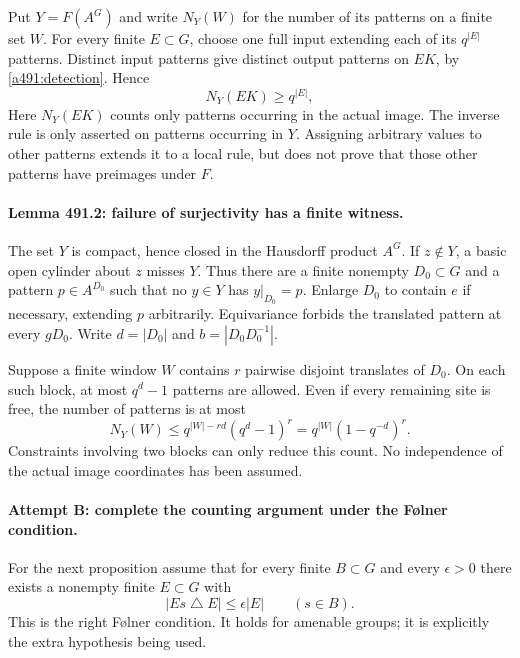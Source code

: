 \documentclass[11pt]{article}
\begin{document}
Put $Y=F(A^G)$ and write $N_Y(W)$ for the number of its patterns on a finite set $W$.
For every finite $E\subset G$, choose one full input extending each of its
$q^{|E|}$ patterns. Distinct input patterns give distinct output patterns
on $EK$, by \eqref{a491:detection}. Hence
\begin{equation}\label{a491:lower}
                         N_Y(EK)\ge q^{|E|},
\end{equation}
Here $N_Y(EK)$ counts only patterns occurring in the actual image.
The inverse rule is only asserted on patterns occurring in $Y$.
Assigning arbitrary values to other patterns extends it to a local rule,
but does not prove that those other patterns have preimages under $F$.

\paragraph{Lemma 491.2: failure of surjectivity has a finite witness.}
The set $Y$ is compact, hence closed in the Hausdorff product $A^G$.
If $z\notin Y$, a basic open cylinder about $z$ misses $Y$. Thus there
are a finite nonempty $D_0\subset G$ and a pattern $p\in A^{D_0}$ such
that no $y\in Y$ has $y|_{D_0}=p$. Enlarge $D_0$ to contain $e$ if
necessary, extending $p$ arbitrarily. Equivariance forbids the translated
pattern at every $gD_0$. Write $d=|D_0|$ and $b=|D_0D_0^{-1}|$.

Suppose a finite window $W$ contains $r$ pairwise disjoint translates
of $D_0$. On each such block, at most $q^d-1$ patterns are allowed.
Even if every remaining site is free, the number of patterns is at most
\begin{equation}\label{a491:upper}
 N_Y(W)\le q^{|W|-rd}(q^d-1)^r
          =q^{|W|}(1-q^{-d})^r.
\end{equation}
Constraints involving two blocks can only reduce this count. No independence
of the actual image coordinates has been assumed.

\paragraph{Attempt B: complete the counting argument under the F\o lner condition.}
For the next proposition assume that for every finite $B\subset G$ and
every $\epsilon>0$ there exists a nonempty finite $E\subset G$ with
\[
             |Es\mathbin{\triangle}E|\le\epsilon|E|
                         \qquad(s\in B).
\]
This is the right F\o lner condition. It holds for amenable groups; it
is explicitly the extra hypothesis being used.
\end{document}
